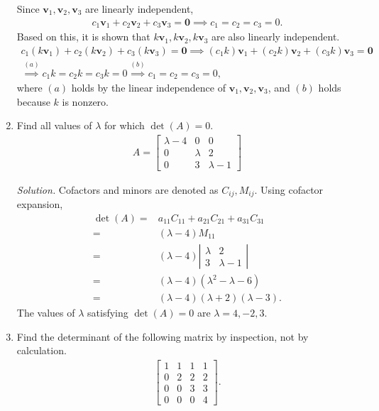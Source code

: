 \documentclass{article}
\begin{document}
\begin{enumerate}
Since $\mathbf{v}_1,\mathbf{v}_2,\mathbf{v}_3$ are linearly independent,
	\begin{align*}
	c_1\mathbf{v}_1+c_2\mathbf{v}_2+c_3\mathbf{v}_3=\mathbf{0}\implies c_1=c_2=c_3=0.	
	\end{align*}
Based on this, it is shown that $k\mathbf{v}_1,k\mathbf{v}_2,k\mathbf{v}_3$ are also linearly independent.
	\begin{align*}
	c_1(k\mathbf{v}_1)+c_2(k\mathbf{v}_2)+c_3(k\mathbf{v}_3)=\mathbf{0}	\implies (c_1k)\mathbf{v}_1+(c_2k)\mathbf{v}_2+(c_3k)\mathbf{v}_3=\mathbf{0}\\
	\stackrel{(a)}{\implies} c_1k=c_2k=c_3k=0 \stackrel{(b)}{\implies} c_1=c_2=c_3=0,
	\end{align*}
where $(a)$ holds by the linear independence of $\mathbf{v}_1,\mathbf{v}_2,\mathbf{v}_3$, and $(b)$ holds because $k$ is nonzero.

\item
Find all values of $\lambda$ for which $\det(A)=0$.
	\begin{align*}
	A=\left[\begin{array}{lll} \lambda-4&0&0 \\ 0&\lambda&2 \\ 0&3&\lambda-1 \end{array}\right]	
	\end{align*}
	
\emph{Solution.}
Cofactors and minors are denoted as $C_{ij},M_{ij}$.
Using cofactor expansion,
	\begin{align*}
	\det(A)=&a_{11}C_{11}+a_{21}C_{21}+a_{31}C_{31}\\
	=&	(\lambda-4) M_{11}\\
	=&( \lambda-4 )\left|\begin{array}{ll} \lambda&2 \\ 3&\lambda-1 \end{array}\right|\\
	=&(\lambda-4) (\lambda^2-\lambda-6)\\
	=&(\lambda-4) (\lambda+2)(\lambda-3).
	\end{align*}
The values of $\lambda$ satisfying $\det(A)=0$ are $\lambda=4,-2,3$.


\item Find the determinant of the following matrix by inspection, not by calculation.
	\begin{align*}
	\left[ \begin{array}{llll} 1&1&1&1 \\ 0&2&2&2 \\ 0&0&3&3 \\ 0&0&0&4 \end{array}\right].	
	\end{align*}


\end{enumerate}
\end{document}
